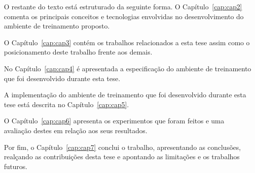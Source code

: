 O restante do texto está estruturado da seguinte forma. O Capítulo~\ref{cap:cap2} comenta os principais conceitos e tecnologias envolvidas no desenvolvimento do ambiente de treinamento proposto.

O Capítulo~\ref{cap:cap3} contém os trabalhos relacionados a esta tese assim como o posicionamento deste trabalho frente aos demais.

No Capítulo~\ref{cap:cap4} é apresentada a especificação do ambiente de treinamento que foi desenvolvido durante esta tese. 

A implementação do ambiente de treinamento que foi desenvolvido durante esta tese está descrita no Capítulo~\ref{cap:cap5}. 

O Capítulo~\ref{cap:cap6} apresenta os experimentos que foram feitos e uma avaliação destes em relação aos seus resultados.

Por fim, o Capítulo~\ref{cap:cap7} conclui o trabalho, apresentando as conclusões, realçando as contribuições desta tese e apontando as limitações e os  trabalhos futuros.


